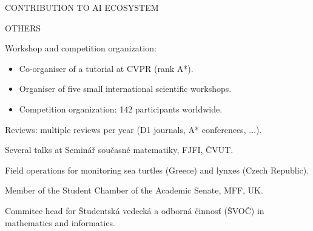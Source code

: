\documentclass[11pt, aspectratio=169]{beamer}
\newenvironment{wideitemize}{\itemize\addtolength{\itemsep}{10pt}}{\enditemize}
\begin{document}


\begin{frame}{CONTRIBUTION TO AI ECOSYSTEM}
\begin{minipage}[t]{0.63\textwidth}
\begin{wideitemize}
\end{wideitemize}
\end{minipage}
\hfill
\begin{minipage}[t]{0.34\textwidth}
\end{minipage}
\end{frame}

\begin{frame}{OTHERS}
\begin{wideitemize}
\item Workshop and competition organization:
\begin{itemize}
\item Co-organiser of a tutorial at CVPR (rank A*).
\item Organiser of five small international scientific workshops.
\item Competition organization: 142 participants worldwide.
\end{itemize}
\pause \item Reviews: multiple reviews per year (D1 journals, A* conferences, $\dots$).
\pause \item Several talks at Seminář současné matematiky, FJFI, ČVUT.
\item Field operations for monitoring sea turtles (Greece) and lynxes (Czech Republic).
\item Member of the Student Chamber of the Academic Senate, MFF, UK.
\item Commitee head for Študentská vedecká a odborná činnosť (ŠVOČ) in mathematics and informatics.
\end{wideitemize}
\end{frame}
\end{document}
